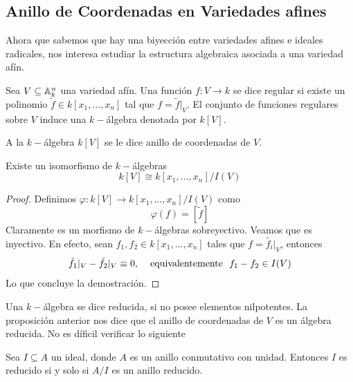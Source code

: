 \documentclass[11pt]{article}
\begin{document}
\newpage

\subsection{Anillo de Coordenadas en Variedades afines}

\noindent Ahora que sabemos que hay una biyección entre variedades afines e ideales radicales, nos
interesa estudiar la estructura algebraica asociada a una variedad afín.

\begin{dfn}
    Sea $V\subseteq\mathbb{A}_{k}^{n}$ una variedad afín. Una función $f:V\to k$ se dice regular si existe
    un polinomio $\tilde{f}\in k[x_{1},\dots,x_{n}]$ tal que $f=\tilde{f}|_{V}$. El conjunto de 
    funciones regulares sobre $V$ induce una $k-$álgebra denotada por $k[V]$.
\end{dfn}

\noindent A la $k-$álgebra $k[V]$ se le dice anillo de coordenadas de $V$.

\begin{prop}
    Existe un isomorfismo de $k-$álgebras
    \begin{equation*}
        k[V]\cong k[x_{1},\dots,x_{n}]/I(V)
    \end{equation*}
\end{prop}

\begin{proof}
    Definimos $\varphi:k[V]\to k[x_{1},\dots,x_{n}]/I(V)$ como
    \begin{equation*}
        \varphi(f)=[\tilde{f}]
    \end{equation*}
    Claramente es un morfismo de $k-$álgebras sobreyectivo. Veamos que es inyectivo. En efecto,
    sean $f_{1},f_{2}\in k[x_{1},\dots,x_{n}]$ tales que $f=\tilde{f_{i}}|_{V}$, entonces
    \begin{equation*}
        \tilde{f_{1}}|_{V}-\tilde{f_{2}}|_{V}\equiv0,
        \htext{equivalentemente } f_{1}-f_{2}\in I(V)
    \end{equation*}
    Lo que concluye la demostración.
\end{proof}

\obs Una $k-$álgebra se dice reducida, si no posee elementos nilpotentes. La proposición anterior 
nos dice que el anillo de coordenadas de $V$ es un álgebra reducida. No es díficil verificar lo
siguiente

\begin{lema}
    Sea $I\subseteq A$ un ideal, donde $A$ es un anillo conmutativo con unidad. Entonces $I$ es 
    reducido si y solo si $A/I$ es un anillo reducido.
\end{lema}
\end{document}

